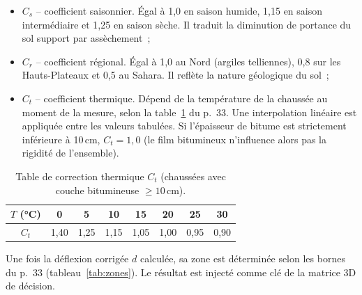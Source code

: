 \begin{itemize}
  \item \textbf{$C_s$} -- coefficient saisonnier. Égal à 1,0 en saison
        humide, 1,15 en saison intermédiaire et 1,25 en saison sèche.
        Il traduit la diminution de portance du sol support par
        assèchement~;
  \item \textbf{$C_r$} -- coefficient régional. Égal à 1,0 au Nord
        (argiles telliennes), 0,8 sur les Hauts-Plateaux et 0,5 au
        Sahara. Il reflète la nature géologique du sol~;
  \item \textbf{$C_t$} -- coefficient thermique. Dépend de la
        température de la chaussée au moment de la mesure, selon la
        table~\ref{tab:ct} du \cttp{} p.~33. Une interpolation linéaire
        est appliquée entre les valeurs tabulées. Si l'épaisseur de
        bitume est strictement inférieure à 10\,cm, $C_t = 1{,}0$ (le
        film bitumineux n'influence alors pas la rigidité de
        l'ensemble).
\end{itemize}

\begin{table}[H]
\centering
\caption{Table de correction thermique $C_t$ (chaussées avec couche
bitumineuse $\geq 10$\,cm).}
\label{tab:ct}
\begin{tabular}{@{}cccccccc@{}}
\toprule
$T$ (\si{\celsius}) & 0 & 5 & 10 & 15 & 20 & 25 & 30 \\
\midrule
$C_t$ & 1,40 & 1,25 & 1,15 & 1,05 & 1,00 & 0,95 & 0,90 \\
\bottomrule
\end{tabular}
\end{table}

Une fois la déflexion corrigée $d$ calculée, sa zone est déterminée
selon les bornes du \cttp{} p.~33 (tableau~\ref{tab:zones}). Le
résultat est injecté comme clé de la matrice 3D de décision.

